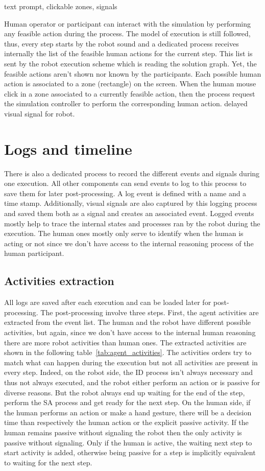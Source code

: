 text prompt, clickable zones, signals

Human operator or participant can interact with the simulation by performing any feasible action during the process. The model of execution is still followed, thus, every step starts by the robot sound and a dedicated process receives internally the list of the feasible human actions for the current step. This list is sent by the robot execution scheme which is reading the solution graph. Yet, the feasible actions aren't shown nor known by the participants.
Each possible human action is associated to a zone (rectangle) on the screen. When the human mouse click in a zone associated to a currently feasible action, then the process request the simulation controller to perform the corresponding human action.  delayed visual signal for robot.

\section{Logs and timeline}

There is also a dedicated process to record the different events and signals during one execution. All other components can send events to log to this process to save them for later post-processing. A log event is defined with a name and a time stamp. Additionally, visual signals are also captured by this logging process and saved them both as a signal and creates an associated event. Logged events mostly help to trace the internal states and processes ran by the robot during the execution. The human ones mostly only serve to identify when the human is acting or not since we don't have access to the internal reasoning process of the human participant. 

\subsection{Activities extraction}

All logs are saved after each execution and can be loaded later for post-processing. The post-processing involve three steps. First, the agent activities are extracted from the event list. The human and the robot have different possible activities, but again, since we don't have access to the internal human reasoning there are more robot activities than human ones. The extracted activities are shown in the following table~\ref{tab:agent_activities}. The activities orders try to match what can happen during the execution but not all activities are present in every step. Indeed, on the robot side, the ID process isn't always necessary and thus not always executed, and the robot either perform an action or is passive for diverse reasons. But the robot always end up waiting for the end of the step, perform the SA process and get ready for the next step. On the human side, if the human performs an action or make a hand gesture, there will be a decision time than respectively the human action or the explicit passive activity. If the human remains passive without signaling the robot then the only activity is passive without signaling. Only if the human is active, the waiting next step to start activity is added, otherwise being passive for a step is implicitly equivalent to waiting for the next step.  

